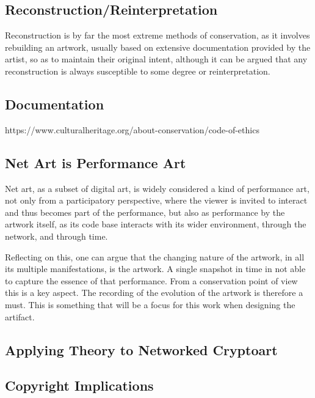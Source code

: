 \subsection{Reconstruction/Reinterpretation}

Reconstruction is by far the most extreme methods of conservation, as it involves rebuilding an artwork, usually based on extensive documentation provided by the artist, so as to maintain their original intent, although it can be argued that any reconstruction is always susceptible to some degree or reinterpretation\cite{huberNewMediaOld2013}.

\subsection{Documentation}

\todo https://www.culturalheritage.org/about-conservation/code-of-ethics

\subsection{Net Art is Performance Art}

Net art, as a subset of digital art, is widely considered a kind of performance art, not only from a participatory perspective, where the viewer is invited to interact and thus becomes part of the performance, but also as performance by the artwork itself, as its code base interacts with its wider environment, through the network, and through time.

Reflecting on this, one can argue that the changing nature of the artwork, in all its multiple manifestations, is the artwork. A single snapshot in time in not able to capture the essence of that performance. From a conservation point of view this is a key aspect. The recording of the evolution of the artwork is therefore a must. This is something that will be a focus for this work when designing the artifact.

\subsection{Applying Theory to Networked Cryptoart}


\todo


\subsection{Copyright Implications}
\label{subsec:chap2_copyright}

